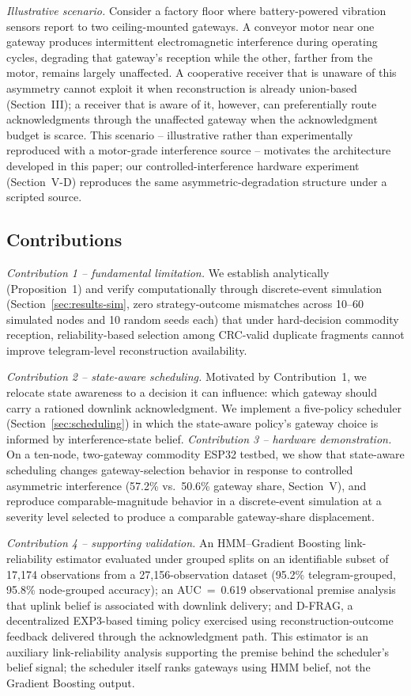 \documentclass[journal]{IEEEtran}
\begin{document}
\textit{Illustrative scenario.} Consider a factory floor where battery-powered vibration sensors report to two ceiling-mounted gateways. A conveyor motor near one gateway produces intermittent electromagnetic interference during operating cycles, degrading that gateway's reception while the other, farther from the motor, remains largely unaffected. A cooperative receiver that is unaware of this asymmetry cannot exploit it when reconstruction is already union-based (Section~III); a receiver that is aware of it, however, can preferentially route acknowledgments through the unaffected gateway when the acknowledgment budget is scarce. This scenario -- illustrative rather than experimentally reproduced with a motor-grade interference source -- motivates the architecture developed in this paper; our controlled-interference hardware experiment (Section~V-D) reproduces the same asymmetric-degradation structure under a scripted source.




\subsection{Contributions}

\textit{Contribution 1 -- fundamental limitation.} We establish analytically (Proposition~1) and verify computationally through discrete-event simulation (Section~\ref{sec:results-sim}, zero strategy-outcome mismatches across 10--60 simulated nodes and 10 random seeds each) that under hard-decision commodity reception, reliability-based selection among CRC-valid duplicate fragments cannot improve telegram-level reconstruction availability.

\textit{Contribution 2 -- state-aware scheduling.} Motivated by Contribution~1, we relocate state awareness to a decision it can influence: which gateway should carry a rationed downlink acknowledgment. We implement a five-policy scheduler (Section~\ref{sec:scheduling}) in which the state-aware policy's gateway choice is informed by interference-state belief.
\textit{Contribution 3 -- hardware demonstration.} On a ten-node, two-gateway commodity ESP32 testbed, we show that state-aware scheduling changes gateway-selection behavior in response to controlled asymmetric interference (57.2\% vs.\ 50.6\% gateway share, Section~V), and reproduce comparable-magnitude behavior in a discrete-event simulation at a severity level selected to produce a comparable gateway-share displacement.

\textit{Contribution 4 -- supporting validation.} An HMM--Gradient Boosting link-reliability estimator evaluated under grouped splits on an identifiable subset of 17{,}174 observations from a 27{,}156-observation dataset (95.2\% telegram-grouped, 95.8\% node-grouped accuracy); an AUC~=~0.619 observational premise analysis that uplink belief is associated with downlink delivery; and D-FRAG, a decentralized EXP3-based timing policy exercised using reconstruction-outcome feedback delivered through the acknowledgment path. This estimator is an auxiliary link-reliability analysis supporting the premise behind the scheduler's belief signal; the scheduler itself ranks gateways using HMM belief, not the Gradient Boosting output.
\end{document}
